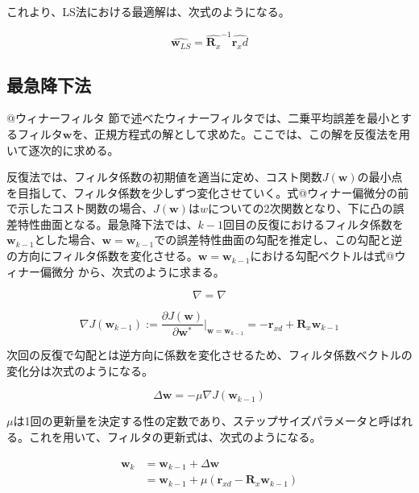 これより、LS法における最適解は、次式のようになる。

\begin{equation}
\hat{\bm{w}_{LS}} = \hat{\bm{R}_x}^{-1} \hat{\bm{r}_xd}
\end{equation}

\subsection{最急降下法}\label{sd}

@ウィナーフィルタ
節で述べたウィナーフィルタでは、二乗平均誤差を最小とするフィルタ\(\bm{w}\)を、正規方程式の解として求めた。ここでは、この解を反復法を用いて逐次的に求める。

反復法では、フィルタ係数の初期値を適当に定め、コスト関数\(J(\bm{w})\)の最小点を目指して、フィルタ係数を少しずつ変化させていく。式@ウィナー偏微分の前
で示したコスト関数の場合、\(J(\bm{w})\)は\(w\)についての2次関数となり、下に凸の誤差特性曲面となる。最急降下法では、\(k-1\)回目の反復におけるフィルタ係数を\(\bm{w}_{k-1}\)とした場合、\(\bm{w} = \bm{w}_{k-1}\)での誤差特性曲面の勾配を推定し、この勾配と逆の方向にフィルタ係数を変化させる。\(\bm{w} = \bm{w}_{k-1}\)における勾配ベクトルは式@ウィナー偏微分
から、次式のように求まる。

\begin{equation}
  \nabla=\nabla
\end{equation}

\begin{equation}
\nabla J(\bm{w}_{k-1}) := \frac{\partial J(\bm{w})}{\partial \bm{w}^*} |_{\bm{w} = \bm{w}_{k-1}} = - \bm{r}_{xd} + \bm{R}_x \bm{w}_{k-1}
\end{equation}

次回の反復で勾配とは逆方向に係数を変化させるため、フィルタ係数ベクトルの変化分は次式のようになる。

\begin{equation}
\Delta \bm{w} = - \mu \nabla J(\bm{w}_{k-1})
\end{equation}

\(\mu\)は1回の更新量を決定する性の定数であり、ステップサイズパラメータと呼ばれる。これを用いて、フィルタの更新式は、次式のようになる。

\begin{equation}
\begin{split}
\bm{w}_k &= \bm{w}_{k-1} + \Delta \bm{w} \\
         &= \bm{w}_{k-1} + \mu (\bm{r}_{xd} - \bm{R}_x \bm{w}_{k-1})
\end{split}
\end{equation}

